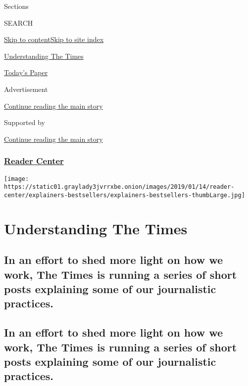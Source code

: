 Sections

SEARCH

\protect\hyperlink{site-content}{Skip to
content}\protect\hyperlink{site-index}{Skip to site index}

\href{https://www.nytimes3xbfgragh.onion/series/understanding-the-times}{Understanding
The Times}

\href{https://myaccount.nytimes3xbfgragh.onion/auth/login?response_type=cookie\&client_id=vi}{}

\href{https://www.nytimes3xbfgragh.onion/section/todayspaper}{Today's
Paper}

Advertisement

\protect\hyperlink{after-top}{Continue reading the main story}

Supported by

\protect\hyperlink{after-sponsor}{Continue reading the main story}

\hypertarget{reader-center}{%
\subsubsection{\texorpdfstring{\href{/section/reader-center}{Reader
Center}}{Reader Center}}\label{reader-center}}

\texttt{[image: https://static01.graylady3jvrrxbe.onion/images/2019/01/14/reader-center/explainers-bestsellers/explainers-bestsellers-thumbLarge.jpg]}

\hypertarget{understanding-the-times}{%
\section{Understanding The Times}\label{understanding-the-times}}

\hypertarget{in-an-effort-to-shed-more-light-on-how-we-work-the-times-is-running-a-series-of-short-posts-explaining-some-of-our-journalistic-practices}{%
\subsection{In an effort to shed more light on how we work, The Times is
running a series of short posts explaining some of our journalistic
practices.}\label{in-an-effort-to-shed-more-light-on-how-we-work-the-times-is-running-a-series-of-short-posts-explaining-some-of-our-journalistic-practices}}

\hypertarget{in-an-effort-to-shed-more-light-on-how-we-work-the-times-is-running-a-series-of-short-posts-explaining-some-of-our-journalistic-practices-1}{%
\subsection{In an effort to shed more light on how we work, The Times is
running a series of short posts explaining some of our journalistic
practices.}\label{in-an-effort-to-shed-more-light-on-how-we-work-the-times-is-running-a-series-of-short-posts-explaining-some-of-our-journalistic-practices-1}}

